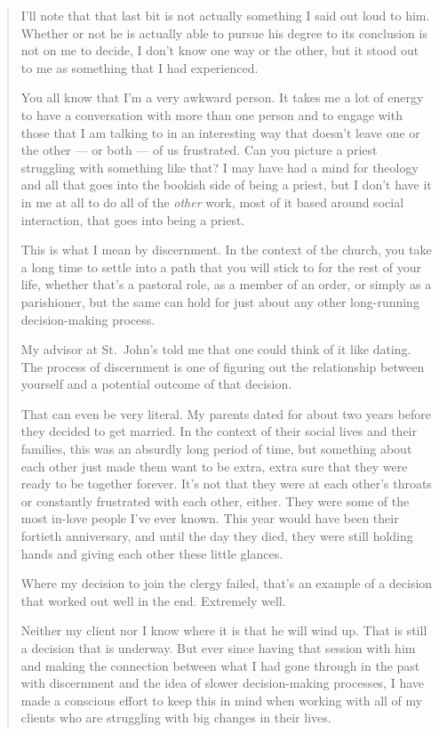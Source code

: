 \begin{quote}
I'll note that that last bit is not actually something I said out loud to him. Whether or not he is actually able to pursue his degree to its conclusion is not on me to decide, I don't know one way or the other, but it stood out to me as something that I had experienced.

You all know that I'm a very awkward person. It takes me a lot of energy to have a conversation with more than one person and to engage with those that I am talking to in an interesting way that doesn't leave one or the other --- or both --- of us frustrated. Can you picture a priest struggling with something like that? I may have had a mind for theology and all that goes into the bookish side of being a priest, but I don't have it in me at all to do all of the \emph{other} work, most of it based around social interaction, that goes into being a priest.

This is what I mean by discernment. In the context of the church, you take a long time to settle into a path that you will stick to for the rest of your life, whether that's a pastoral role, as a member of an order, or simply as a parishioner, but the same can hold for just about any other long-running decision-making process.

My advisor at St.~John's told me that one could think of it like dating. The process of discernment is one of figuring out the relationship between yourself and a potential outcome of that decision.

That can even be very literal. My parents dated for about two years before they decided to get married. In the context of their social lives and their families, this was an absurdly long period of time, but something about each other just made them want to be extra, extra sure that they were ready to be together forever. It's not that they were at each other's throats or constantly frustrated with each other, either. They were some of the most in-love people I've ever known. This year would have been their fortieth anniversary, and until the day they died, they were still holding hands and giving each other these little glances.

Where my decision to join the clergy failed, that's an example of a decision that worked out well in the end. Extremely well.

Neither my client nor I know where it is that he will wind up. That is still a decision that is underway. But ever since having that session with him and making the connection between what I had gone through in the past with discernment and the idea of slower decision-making processes, I have made a conscious effort to keep this in mind when working with all of my clients who are struggling with big changes in their lives.
\end{quote}

